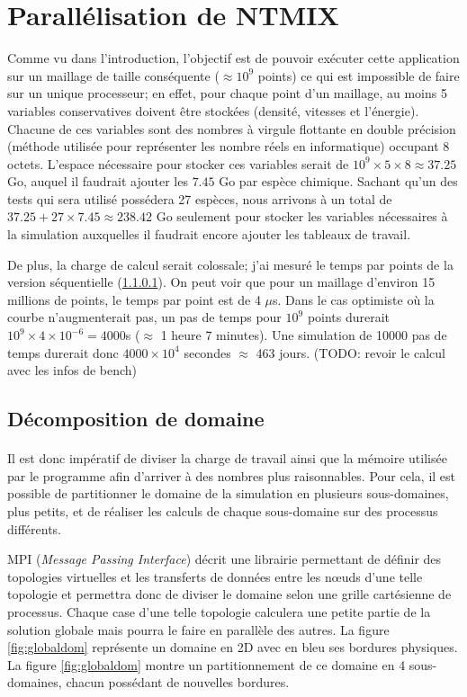 \section{Parallélisation de NTMIX} \label{sec:part2}


Comme vu dans l'introduction, l'objectif est de pouvoir exécuter cette application sur un maillage de taille conséquente ($\approx 10^9$ points) ce qui est impossible de faire sur un unique processeur; en effet, pour chaque point d'un maillage, au moins 5 variables conservatives doivent être stockées (densité, vitesses et l'énergie). Chacune de ces variables sont des nombres à virgule flottante en double précision (méthode utilisée pour représenter les nombre réels en informatique) occupant 8 octets. L'espace nécessaire pour stocker ces variables serait de $10^9 \times 5 \times 8 \approx 37.25$ Go, auquel il faudrait ajouter les $7.45$ Go par espèce chimique. Sachant qu'un des tests qui sera utilisé possédera 27 espèces, nous arrivons à un total de $37.25+27 \times 7.45\approx 238.42$ Go seulement pour stocker les variables nécessaires à la simulation auxquelles il faudrait encore ajouter les tableaux de travail.

De plus, la charge de calcul serait colossale; j'ai mesuré le temps par points de la version séquentielle (\ref{}). On peut voir que pour un maillage d'environ 15 millions de points, le temps par point est de 4 $\mu$s. Dans le cas optimiste où la courbe n'augmenterait pas, un pas de temps pour $10^9$ points durerait $10^9\times4\times10^{-6}=4000$s ($\approx$ 1 heure 7 minutes). Une simulation de 10000 pas de temps durerait donc $4000\times10^4$ secondes $\approx$ 463 jours. (TODO: revoir le calcul avec les infos de bench)

\subsection{Décomposition de domaine}
\paragraph{}Il est donc impératif de diviser la charge de travail ainsi que la mémoire utilisée par le programme afin d'arriver à des nombres plus raisonnables. Pour cela, il est possible de partitionner le domaine de la simulation en plusieurs sous-domaines, plus petits, et de réaliser les calculs de chaque sous-domaine sur des processus différents. 

MPI (\textit{Message Passing Interface}) décrit une librairie permettant de définir des topologies virtuelles et les transferts de données entre les nœuds d'une telle topologie et permettra donc de diviser le domaine selon une grille cartésienne de processus. Chaque case d'une telle topologie calculera une petite partie de la solution globale mais pourra le faire en parallèle des autres. La figure \ref{fig:globaldom} représente un domaine en 2D avec en bleu ses bordures physiques. La figure \ref{fig:globaldom} montre un partitionnement de ce domaine en 4 sous-domaines, chacun possédant de nouvelles bordures.

